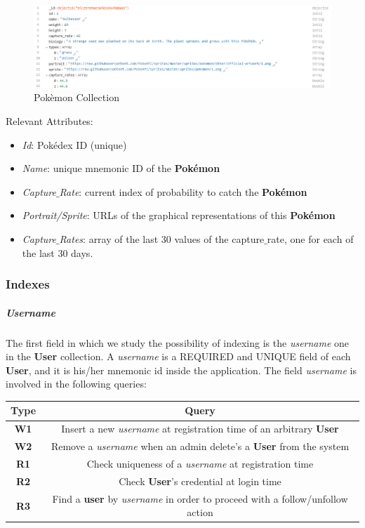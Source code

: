\begin{figure}[H]
	\centering
	\includegraphics[width=\textwidth]{img/pokemon_collection.png}
	\caption{Pokèmon Collection}
\end{figure}
Relevant Attributes:
\begin{itemize}
	\item \textit{Id}: Pokédex ID (unique)
	\item \textit{Name}: unique mnemonic ID of the \textbf{Pokémon}
	\item \textit{Capture$\_$Rate}: current index of probability to catch the \textbf{Pokémon}
	\item \textit{Portrait/Sprite}: URLs of the graphical representations of this \textbf{Pokémon}
	\item \textit{Capture$\_$Rates}: array of the last 30 values of the capture$\_$rate, one for each of the last 30 days.
\end{itemize}

\subsubsection{Indexes}

\subparagraph{Username}
The first field in which we study the possibility of indexing is the \textit{username} one in the \textbf{User} collection. A \textit{username} is a REQUIRED and UNIQUE field of each \textbf{User}, and it is his/her mnemonic id inside the application.
The field \textit{username} is involved in the following queries:
\begin{center}
	\begin{tabular}{|c | c |} 
		\hline
		\textbf{Type} & \textbf{Query} \\ [0.5ex] 
		\hline
		\textbf{W1} & Insert a new \textit{username} at registration time of an arbitrary \textbf{User} \\ 
		\hline
		\textbf{W2} & Remove a \textit{username} when an admin delete’s a \textbf{User} from the system \\
		\hline
		\textbf{R1} & Check uniqueness of a \textit{username} at registration time \\
		\hline
		\textbf{R2} & Check \textbf{User}’s credential at login time \\
		\hline
		\textbf{R3} & Find a \textbf{user} by \textit{username} in order to proceed with a follow/unfollow action \\
		\hline
	\end{tabular}
\end{center}

